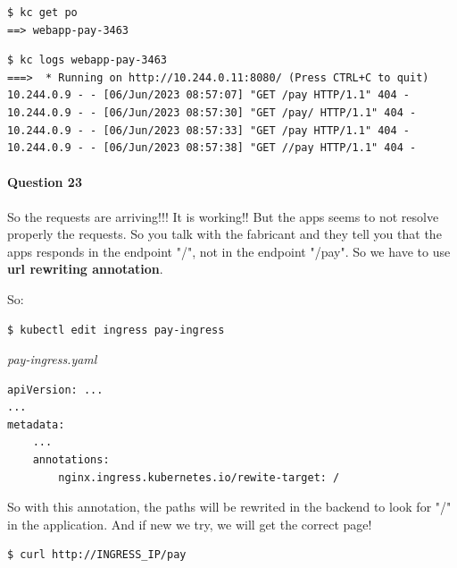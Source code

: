 \documentclass{article}
\newenvironment{codetemplate}[1][]{%
  \mybasecolorbox[#1]
  \itshape
}{%
  \endmybasecolorbox
}
\begin{document}
\begin{codetemplate}{}
\begin{verbatim}
$ kc get po
==> webapp-pay-3463
\end{verbatim}
\end{codetemplate}
\begin{codetemplate}{}
\begin{verbatim}
$ kc logs webapp-pay-3463
===>  * Running on http://10.244.0.11:8080/ (Press CTRL+C to quit)
10.244.0.9 - - [06/Jun/2023 08:57:07] "GET /pay HTTP/1.1" 404 -
10.244.0.9 - - [06/Jun/2023 08:57:30] "GET /pay/ HTTP/1.1" 404 -
10.244.0.9 - - [06/Jun/2023 08:57:33] "GET /pay HTTP/1.1" 404 -
10.244.0.9 - - [06/Jun/2023 08:57:38] "GET //pay HTTP/1.1" 404 -
\end{verbatim}
\end{codetemplate}

\paragraph{Question 23}

So the requests are arriving!!! It is working!! But the apps seems to not resolve properly the requests. So you talk with the fabricant and they tell you that the apps responds in the endpoint "/", not in the endpoint "/pay". So we have to use \textbf{url rewriting annotation}.

So:

\begin{codetemplate}{}
\begin{verbatim}
$ kubectl edit ingress pay-ingress
\end{verbatim}
\end{codetemplate}
\begin{codetemplate}{pay-ingress.yaml}
\begin{verbatim}
apiVersion: ...
...
metadata:
    ...
    annotations:
        nginx.ingress.kubernetes.io/rewite-target: /
\end{verbatim}
\end{codetemplate}

So with this annotation, the paths will be rewrited in the backend to look for "/" in the application. And if new we try, we will get the correct page!

\begin{codetemplate}{}
\begin{verbatim}
$ curl http://INGRESS_IP/pay
\end{verbatim}
\end{codetemplate}
\end{document}

